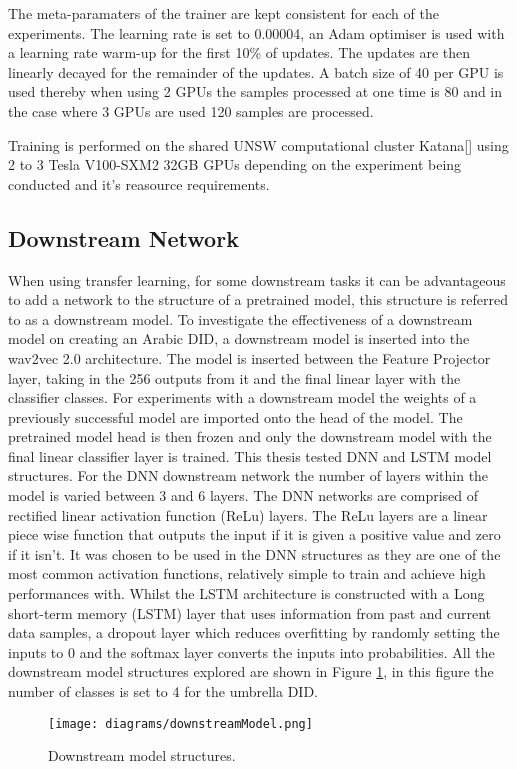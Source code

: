 The meta-paramaters of the trainer are kept consistent for each of the experiments. The learning rate is set to 0.00004, an Adam optimiser is used with a learning rate warm-up for the first 
10\% of updates. The updates are then linearly decayed for the remainder of the updates. A batch size of 40 per GPU is used thereby when using 2 GPUs the samples processed at one time is 80 and 
in the case where 3 GPUs are used 120 samples are processed. 

Training is performed on the shared UNSW computational cluster Katana[] using 2 to 3 Tesla V100-SXM2 32GB GPUs depending on the experiment being conducted and it's reasource requirements. 
\subsection{Downstream Network}\label{sec:down}
When using transfer learning, for some downstream tasks it can be advantageous to add a network to the structure of a pretrained model, this structure is referred to as a downstream model. 
To investigate the effectiveness of a downstream model on creating an Arabic DID, a downstream model is inserted into the wav2vec 2.0 architecture. 
The model is inserted between the Feature Projector layer, taking in the 256 outputs from it and the final linear layer with the classifier classes. 
For experiments with a downstream model the weights of a previously successful model are imported onto the head of the model. The pretrained model head is then 
frozen and only the downstream model with the final linear classifier layer is trained. This thesis tested DNN and LSTM model structures. 
For the DNN downstream network the number of layers within the model is varied between 3 and 6 layers. 
The DNN networks are comprised of rectified linear activation function (ReLu) layers. The ReLu layers are a linear piece wise function that outputs the input if it is given a positive value and zero if it isn't. 
It was chosen to be used in the DNN structures as they are one of the most common activation functions, relatively simple to train and achieve high performances with. Whilst the 
LSTM architecture is constructed with a Long short-term memory (LSTM) layer that uses information from past and current data samples, a dropout layer which reduces overfitting by randomly setting the inputs to 0 and 
the softmax layer converts the inputs into probabilities. All the downstream model structures explored are shown in Figure \ref{fig:downModel}, in this figure the number of classes is set to 4 for the umbrella DID. 

\begin{figure}[h!]
    \centering
    \texttt{[image: diagrams/downstreamModel.png]}
    \caption{Downstream model structures.}
    \label{fig:downModel}
\end{figure}